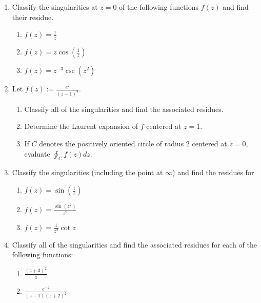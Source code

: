 \documentclass[a4paper,10pt]{article}
\begin{document}
\begin{enumerate}
 	\item Classify the singularities at $z = 0$ of the following functions $f(z)$ and find their residue.
 	
 	\begin{enumerate}
 		\item $f(z) = \frac{1}{z}$
 		
 		\item $f(z) = z \cos \left( \frac{1}{z} \right)$
 		
 		\item $f(z) = z^{-3} \csc(z^2)$
 	\end{enumerate}
 	
 	\item Let $f(z):= \frac{e^z}{(z - 1)^4}$.
 	
 	\begin{enumerate}
 		\item Classify all of the singularities and find the associated residues.
 		
 		\item Determine the Laurent expansion of $f$ centered at $z = 1$.
 		
 		\item If $C$ denotes the positively oriented circle of radius 2 centered at $z = 0$, evaluate $\oint_C f(z) dz$.
 	\end{enumerate}
 	
 	\item Classify the singularities (including the point at $\infty$) and find the residues for
 	
 	\begin{enumerate}
 		\item $f(z) = \sin \left( \frac{1}{z} \right)$
 		
 		\item $f(z) = \frac{\sin(z^2)}{z^7}$
 		
 		\item $f(z) = \frac{1}{z^2} \cot z$
 	\end{enumerate}
 	
 	\item Classify all of the singularities and find the associated residues for each of the following functions:
 	
 	\begin{enumerate}
 		\item $\frac{(z + 3)^2}{z}$
 		
 		\item $\frac{e^{-z}}{(z - 1)(z + 2)^2}$
 	\end{enumerate}
 	

\end{enumerate}
\end{document}
